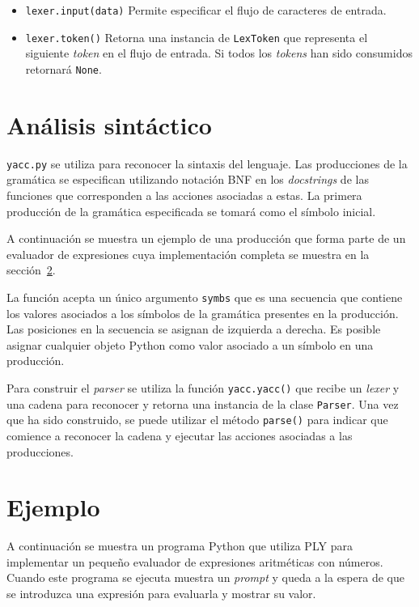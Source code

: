 \documentclass{article}
\begin{document}
\begin{itemize}
  \item \texttt{lexer.input(data)} Permite especificar el flujo de caracteres
  	de entrada.
  \item \texttt{lexer.token()} Retorna una instancia de \texttt{LexToken} que
  	representa el siguiente \textit{token} en el flujo de entrada. Si todos los
  	\textit{tokens} han sido consumidos retornará \texttt{None}.
\end{itemize}

\section{Análisis sintáctico}

\texttt{yacc.py} se utiliza para reconocer la sintaxis del lenguaje. Las
producciones de la gramática se especifican utilizando notación BNF en los
\textit{docstrings} de las funciones que corresponden a las acciones asociadas
a estas. La primera producción de la gramática especificada se tomará como el
símbolo inicial.

A continuación se muestra un ejemplo de una producción que forma parte
de un evaluador de expresiones cuya implementación completa se muestra en la
sección~\ref{sec:ejemplo}.

\begin{quote}

\end{quote}

La función acepta un único argumento \texttt{symbs} que es una secuencia
que contiene los valores asociados a los símbolos de la gramática presentes en
la producción. Las posiciones en la secuencia se asignan de izquierda a
derecha. Es posible asignar cualquier objeto Python como valor asociado a un
símbolo en una producción.

Para construir el \textit{parser} se utiliza la función \texttt{yacc.yacc()}
que recibe un \textit{lexer} y una cadena para reconocer y retorna una instancia
de la clase \texttt{Parser}. Una vez que ha sido construido, se puede utilizar
el método \texttt{parse()} para indicar que comience a reconocer la cadena y
ejecutar las acciones asociadas a las producciones.

\section{Ejemplo}
\label{sec:ejemplo}

A continuación se muestra un programa Python que utiliza PLY para implementar
un pequeño evaluador de expresiones aritméticas con números. Cuando este
programa se ejecuta muestra un \textit{prompt} y queda a la espera de que se
introduzca una expresión para evaluarla y mostrar su valor.

\begin{quote}

\end{quote}
\end{document}
